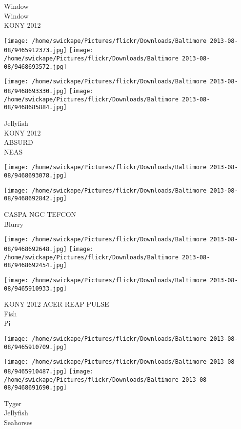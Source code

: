 \documentclass[10pt,letterpaper]{article}
\begin{document}
Window\\
Window\\
KONY 2012
\pagebreak

\texttt{[image: /home/swickape/Pictures/flickr/Downloads/Baltimore 2013-08-08/9465912373.jpg]}
\texttt{[image: /home/swickape/Pictures/flickr/Downloads/Baltimore 2013-08-08/9468693572.jpg]}

\texttt{[image: /home/swickape/Pictures/flickr/Downloads/Baltimore 2013-08-08/9468693330.jpg]}
\texttt{[image: /home/swickape/Pictures/flickr/Downloads/Baltimore 2013-08-08/9468685884.jpg]}

Jellyfish\\
KONY 2012\\
ABSURD\\
NEAS
\pagebreak

\texttt{[image: /home/swickape/Pictures/flickr/Downloads/Baltimore 2013-08-08/9468693078.jpg]}

\vspace{0.25in}
\texttt{[image: /home/swickape/Pictures/flickr/Downloads/Baltimore 2013-08-08/9468692842.jpg]}

CASPA NGC TEFCON\\
Blurry
\pagebreak

\texttt{[image: /home/swickape/Pictures/flickr/Downloads/Baltimore 2013-08-08/9468692648.jpg]}
\texttt{[image: /home/swickape/Pictures/flickr/Downloads/Baltimore 2013-08-08/9468692454.jpg]}

\vspace{0.25in}
\texttt{[image: /home/swickape/Pictures/flickr/Downloads/Baltimore 2013-08-08/9465910933.jpg]}

KONY 2012 ACER REAP PULSE\\
Fish\\
Pi
\pagebreak

\texttt{[image: /home/swickape/Pictures/flickr/Downloads/Baltimore 2013-08-08/9465910709.jpg]}

\vspace{0.25in}
\texttt{[image: /home/swickape/Pictures/flickr/Downloads/Baltimore 2013-08-08/9465910487.jpg]}
\texttt{[image: /home/swickape/Pictures/flickr/Downloads/Baltimore 2013-08-08/9468691690.jpg]}

Tyger\\
Jellyfish\\
Seahorses
\pagebreak
\end{document}
